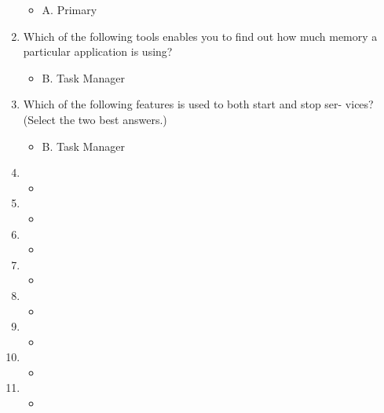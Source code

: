 \documentclass{article}
\begin{document}
\begin{enumerate}
\begin{itemize}
         \item A. Primary
     \end{itemize}
     \item Which of the following tools enables you to find out how much
memory a particular application is using?
     \begin{itemize}
         \item B. Task Manager
     \end{itemize}
     \item Which of the following features is used to both start and stop ser-
vices? (Select the two best answers.)
     \begin{itemize}
         \item B. Task Manager
     \end{itemize}
     \item 
     \begin{itemize}
         \item 
     \end{itemize}
     \item 
     \begin{itemize}
         \item 
     \end{itemize}
     \item 
     \begin{itemize}
         \item 
     \end{itemize}
     \item 
     \begin{itemize}
         \item 
     \end{itemize}
     \item 
     \begin{itemize}
         \item 
     \end{itemize}
     \item 
     \begin{itemize}
         \item 
     \end{itemize}
     \item 
     \begin{itemize}
         \item 
     \end{itemize}
     \item 
     \begin{itemize}
         \item 
     \end{itemize}
\end{enumerate}
\end{document}
